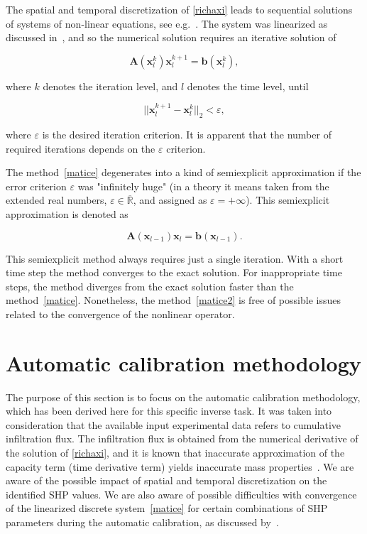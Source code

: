 \documentclass[review,times,3p,twocolumn,10pt]{elsarticle}
\newenvironment{lineq}
    {\begin{linenomath*}
    \begin{equation}
    }
    { 
    \end{equation} 
    \end{linenomath*}
    }
\renewcommand{\vec}{\mathbf}
\begin{document}
 
 The spatial and temporal discretization of \eqref{richaxi} leads to sequential solutions of systems of non-linear equations, see e.g.~\citep{mojecomp}. The system was linearized as discussed in~\citet{mojeacta, mojeamc}, and so the numerical solution requires an iterative solution of 
\begin{lineq}
\label{matice}
\mathbf{A}(\vec{x}_l^k) \vec{x}_l^{k+1} = \vec{b}(\vec{x}_l^k),
\end{lineq}
where $k$ denotes the iteration level, and $l$ denotes the time level, until \begin{lineq} \label{picard} ||\vec{x}_l^{k+1} - \vec{x}_l^k||_2 < \varepsilon , \end{lineq} where $\varepsilon$ is the desired iteration criterion.  It is apparent that the number of required  iterations depends on the $\varepsilon$ criterion. 


The method~\eqref{matice} degenerates into a kind of semiexplicit approximation if the error criterion $\varepsilon$ was "infinitely huge" (in a theory it means taken from the extended real numbers, $\varepsilon \in {\overline {\mathbb {R} }}$, and assigned as $\varepsilon = + \infty$). This semiexplicit approximation is denoted as
\begin{lineq}
\label{matice2}
\mathbf{A}(\vec{x}_{l-1}) \vec{x}_l = \vec{b}(\vec{x}_{l-1}).
\end{lineq}
 This semiexplicit method always requires just a single  iteration. With a short time step the method converges to the exact solution. For inappropriate time steps, the method diverges from the exact solution faster than the method~\eqref{matice}. Nonetheless, the method~\eqref{matice2} is free of possible issues related to the convergence of the nonlinear operator.



\section{Automatic calibration methodology}%


The purpose of this section is to focus on the automatic calibration methodology, which has been derived here for this specific inverse task. 
It was taken into consideration that the  available input experimental data refers to cumulative  infiltration flux.
The infiltration flux is obtained from the numerical derivative of the solution of \eqref{richaxi},  and  it is known that inaccurate approximation of the capacity term (time derivative term) yields inaccurate mass properties~\citep{celia}. We are aware of the possible impact of spatial and temporal discretization on the identified SHP values. We are also aware of possible difficulties with convergence of the linearized discrete system~\eqref{matice} for certain combinations of SHP parameters during the automatic calibration, as discussed by~\cite{beven2003-uncertain}.
\end{document}
